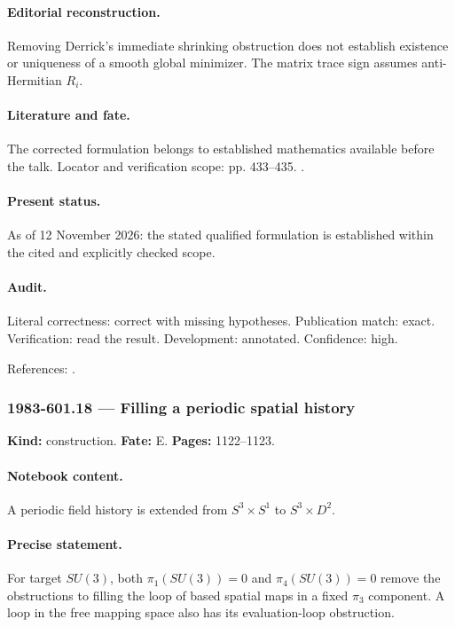 \paragraph{Editorial reconstruction.} Removing Derrick's immediate shrinking obstruction does not establish existence or uniqueness of a smooth global minimizer. The matrix trace sign assumes anti-Hermitian \(R_i\).

\paragraph{Literature and fate.} The corrected formulation belongs to established mathematics available before the talk. Locator and verification scope: pp. 433--435. \cite{witten1983current}.

\paragraph{Present status.} As of 12 November 2026: the stated qualified formulation is established within the cited and explicitly checked scope.

\paragraph{Audit.} Literal correctness: correct with missing hypotheses. Publication match: exact. Verification: read the result. Development: annotated. Confidence: high.

\noindent References: \citep{witten1983current}.\par

\subsubsection{1983-601.18 --- Filling a periodic spatial history}

\label{item:1983-601.18}

\noindent\textbf{Kind:} construction. \textbf{Fate:} E. \textbf{Pages:} 1122--1123.\par

\paragraph{Notebook content.} A periodic field history is extended from \(S^3\times S^1\) to \(S^3\times D^2\).

\paragraph{Precise statement.} For target \(SU(3)\), both \(\pi_1(SU(3))=0\) and \(\pi_4(SU(3))=0\) remove the obstructions to filling the loop of based spatial maps in a fixed \(\pi_3\) component. A loop in the free mapping space also has its evaluation-loop obstruction.

